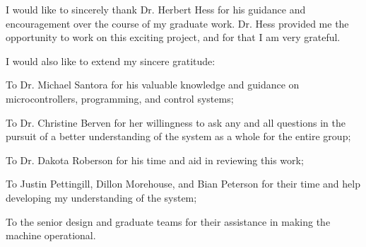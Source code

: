 \onehalfspacing
I would like to sincerely thank Dr. Herbert Hess for his guidance and encouragement over the course of my graduate work. Dr. Hess provided me the opportunity to work on this exciting project, and for that I am very grateful. 

\noindent I would also like to extend my sincere gratitude:

To Dr. Michael Santora for his valuable knowledge and guidance on microcontrollers, programming, and control systems;

To Dr. Christine Berven for her willingness to ask any and all questions in the pursuit of a better understanding of the system as a whole for the entire group;

To Dr. Dakota Roberson for his time and aid in reviewing this work;

To Justin Pettingill, Dillon Morehouse, and Bian Peterson for their time and help developing my understanding of the system;

To the senior design and graduate teams for their assistance in making the machine operational.

